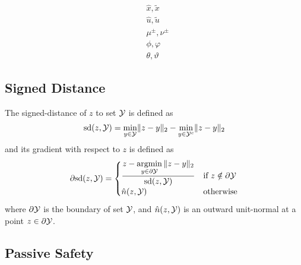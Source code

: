 \documentclass[11pt,a4paper]{article}
\begin{document}
\begin{align}
    & \hat{x}, \tilde{x}\\
    & \hat{u}, \tilde{u}\\
    & \mu^{\pm}, \nu^{\pm}\\
    & \phi, \varphi\\
    & \theta, \vartheta 
\end{align}

\subsection{Signed Distance}

The signed-distance of $z$ to set $\mathcal{Y}$ is defined as
\begin{align}
    \mathrm{sd}(z,\mathcal{Y}) = \underset{y\in\mathcal{Y}}{\mathrm{min}}\|z-y\|_2 - \underset{y\in\mathcal{Y}^c}{\mathrm{min}}\|z-y\|_2\label{sgn-dist}
\end{align}
and its gradient with respect to $z$ is defined as 
\begin{align}
    \partial\mathrm{sd}(z,\mathcal{Y}) = \begin{cases}\displaystyle\frac{z-\underset{y\in\partial\mathcal{Y}}{\mathrm{argmin}}\,\|z-y\|_2}{\mathrm{sd}(z,\mathcal{Y})} &\text{if }z\notin\partial\mathcal{Y}\\\hat{n}(z,\mathcal{Y}) &\text{otherwise}\end{cases}\label{sgn-dist-jac}
\end{align}
where $\partial \mathcal{Y}$ is the boundary of set $\mathcal{Y}$, and $\hat{n}(z,\mathcal{Y})$ is an outward unit-normal at a point $z\in\partial\mathcal{Y}$.

\subsection{Passive Safety}

\newcommand{\deriv}[1]{\overset{\diamond}{#1}}
\end{document}
